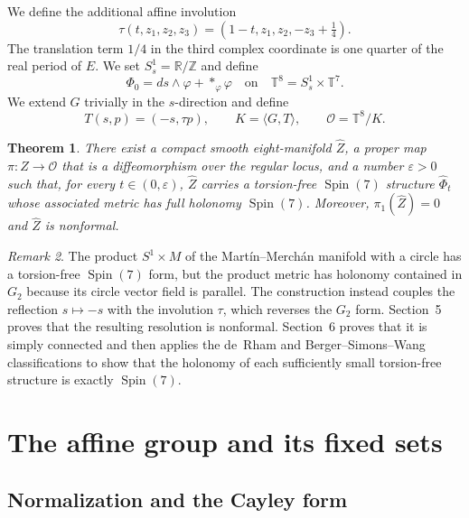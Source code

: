 \documentclass[11pt]{article}
\newtheorem{theorem}{Theorem}[section]
\theoremstyle{remark}\newtheorem{remark}[theorem]{Remark}
\newcommand{\SpinSeven}{\operatorname{Spin}(7)}
\newcommand{\T}{\mathbb T}
\newcommand{\R}{\mathbb R}
\newcommand{\Z}{\mathbb Z}
\begin{document}
We define the additional affine involution
\begin{equation}\label{eq:tau}
\tau(t,z_1,z_2,z_3)=(1-t,z_1,z_2,-z_3+\tfrac14).
\end{equation}
The translation term $1/4$ in the third complex coordinate is one quarter
of the real period of $E$.  We set $S^1_s=\R/\Z$ and define
\begin{equation}\label{eq:cayley-product}
\Phi_0=ds\wedge\varphi+*_{\varphi}\varphi
\quad\text{on}\quad \T^8=S^1_s\times\T^7.
\end{equation}
We extend $G$ trivially in the $s$-direction and define
\begin{equation}\label{eq:T-def}
T(s,p)=(-s,\tau p),\qquad K=\langle G,T\rangle,
\qquad \mathcal O=\T^8/K.
\end{equation}

\begin{theorem}\label{thm:main}
There exist a compact smooth eight-manifold $\widehat Z$, a proper map
$\pi:\widehat Z\to\mathcal O$ that is a diffeomorphism over the regular
locus, and a number $\varepsilon>0$ such that, for every
$t\in(0,\varepsilon)$, $\widehat Z$ carries a torsion-free $\SpinSeven$
structure $\widehat\Phi_t$ whose associated metric has full holonomy
$\SpinSeven$.  Moreover, $\pi_1(\widehat Z)=0$ and $\widehat Z$ is
nonformal.
\end{theorem}

\begin{remark}\label{rem:not-product}
The product $S^1\times M$ of the Mart\'in--Merch\'an manifold with a circle
has a torsion-free $\SpinSeven$ form, but the product metric has holonomy
contained in $G_2$ because its circle vector field is parallel.  The
construction instead couples the reflection $s\mapsto-s$ with the
involution $\tau$, which reverses the $G_2$ form.  Section~5 proves that the
resulting resolution is nonformal.  Section~6 proves that it is simply
connected and then applies the de~Rham and Berger--Simons--Wang
classifications to show that the holonomy of each sufficiently small
torsion-free structure is exactly $\SpinSeven$.
\end{remark}

\section{The affine group and its fixed sets}
\subsection{Normalization and the Cayley form}
\end{document}
